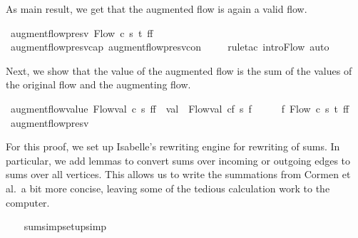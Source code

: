 \begin{isabellebody}
{}
%
\begin{isamarkuptext}%
As main result, we get that the augmented flow is again a valid flow.%
\end{isamarkuptext}\isamarkuptrue%
\isamarkupfalse%
\ augment{\isacharunderscore}flow{\isacharunderscore}presv{\isacharcolon}\ {\isachardoublequoteopen}Flow\ c\ s\ t\ {\isacharparenleft}f{\isasymup}f{\isacharprime}{\isacharparenright}{\isachardoublequoteclose}\isanewline
%
\isadelimproof
\ \ %
\endisadelimproof
%
\isatagproof
{}\isamarkupfalse%
\ augment{\isacharunderscore}flow{\isacharunderscore}presv{\isacharunderscore}cap\ augment{\isacharunderscore}flow{\isacharunderscore}presv{\isacharunderscore}con\ \isanewline
\ \ \isamarkupfalse%
\ {\isacharparenleft}rule{\isacharunderscore}tac\ intro{\isacharunderscore}Flow{\isacharparenright}\ auto%
\endisatagproof
{\isafoldproof}%
%
\isadelimproof
%
\endisadelimproof
%
\isamarkuptrue%
%
\begin{isamarkuptext}%
Next, we show that the value of the augmented flow is the sum of the values
  of the original flow and the augmenting flow.%
\end{isamarkuptext}\isamarkuptrue%
\isamarkupfalse%
\ augment{\isacharunderscore}flow{\isacharunderscore}value{\isacharcolon}\ {\isachardoublequoteopen}Flow{\isachardot}val\ c\ s\ {\isacharparenleft}f{\isasymup}f{\isacharprime}{\isacharparenright}\ {\isacharequal}\ val\ {\isacharplus}\ Flow{\isachardot}val\ cf\ s\ f{\isacharprime}{\isachardoublequoteclose}\isanewline
%
\isadelimproof
%
\endisadelimproof
%
\isatagproof
{}\isamarkupfalse%
\ {\isacharminus}\isanewline
\ \ \isamarkupfalse%
\ f{\isacharprime}{\isacharprime}{\isacharcolon}\ Flow\ c\ s\ t\ {\isachardoublequoteopen}f{\isasymup}f{\isacharprime}{\isachardoublequoteclose}\ \isamarkupfalse%
\ augment{\isacharunderscore}flow{\isacharunderscore}presv\ \isacommand{{\isachardot}}\isamarkupfalse%
%
\begin{isamarkuptxt}%
For this proof, we set up Isabelle's rewriting engine for rewriting of sums.
    In particular, we add lemmas to convert sums over incoming or outgoing 
    edges to sums over all vertices. This allows us to write the summations
    from Cormen et al.~a bit more concise, leaving some of the tedious 
    calculation work to the computer.%
\end{isamarkuptxt}\isamarkuptrue%
\ \ \isamarkupfalse%
\ sum{\isacharunderscore}simp{\isacharunderscore}setup{\isacharbrackleft}simp{\isacharbrackright}\ {\isacharequal}\ \isanewline

\end{isabellebody}
